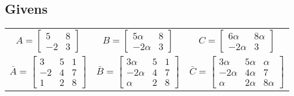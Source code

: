 \documentclass{article}
\begin{document}
    \subsection{Givens}
      \begin{center}
      \begin{tabular}{ccc}
        $A=\begin{bmatrix}5&8\\-2&3\end{bmatrix}$
         & $B=\begin{bmatrix}5\alpha&8\\-2\alpha&3\end{bmatrix}$
         & $C=\begin{bmatrix}6\alpha&8\alpha\\-2\alpha&3\end{bmatrix}$
        \\[0.5cm]
        $\bar{A}=\begin{bmatrix}3&5&1\\-2&4&7\\1&2&8\end{bmatrix}$
         & $\bar{B}=\begin{bmatrix}3\alpha&5&1\\-2\alpha&4&7\\\alpha&2&8\end{bmatrix}$
         & $\bar{C}=\begin{bmatrix}3\alpha&5\alpha&\alpha\\-2\alpha&4\alpha&7\\\alpha&2\alpha&8\alpha\end{bmatrix}$
      \end{tabular}
      \end{center}
\end{document}
